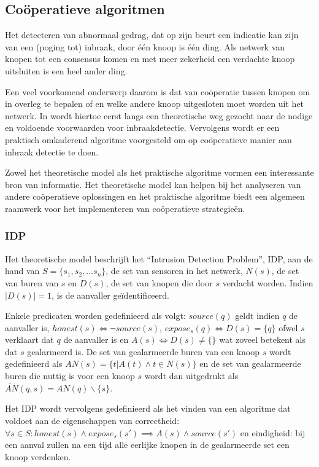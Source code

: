 \subsection{Co\"operatieve algoritmen}
\label{subsection:cooperation}

Het detecteren van abnormaal gedrag, dat op zijn beurt een indicatie kan zijn
van een (poging tot) inbraak, door \'e\'en knoop is \'e\'en ding. Als netwerk
van knopen tot een consensus komen en met meer zekerheid een verdachte knoop
uitsluiten is een heel ander ding.

Een veel voorkomend onderwerp daarom is dat van co\"operatie tussen knopen om
in overleg te bepalen of en welke andere knoop uitgesloten moet worden uit het
netwerk. In \cite{krontiris2009cooperative} wordt hiertoe eerst langs een
theoretische weg gezocht naar de nodige en voldoende voorwaarden voor
inbraakdetectie. Vervolgens wordt er een praktisch omkaderend algoritme
voorgesteld om op co\"operatieve manier aan inbraak detectie te doen.

Zowel het theoretische model als het praktische algoritme vormen een
interessante bron van informatie. Het theoretische model kan helpen bij het
analyseren van andere co\"operatieve oplossingen en het praktische algoritme
biedt een algemeen raamwerk voor het implementeren van co\"operatieve
strategie\"en.

\subsubsection*{IDP}

Het theoretische model beschrijft het ``Intrusion Detection Problem'', IDP, aan
de hand van $S = \{ s_1, s_2, \dots s_n \}$, de set van sensoren in het netwerk,
$N(s)$, de set van buren van $s$ en $D(s)$, de set van knopen die door $s$
verdacht worden. Indien $|D(s)| = 1$, is de aanvaller ge\"identificeerd.

Enkele predicaten worden gedefinieerd als volgt: $source(q)$ geldt indien $q$
de aanvaller is, $honest(s) \iff \neg source(s)$, $expose_s(q) \iff D(s) = \{ q
\}$ ofwel $s$ verklaart dat $q$ de aanvaller is en $A(s) \iff D(s) \not= \{\}$
wat zoveel betekent als dat $s$ gealarmeerd is. De set van gealarmeerde buren
van een knoop $s$ wordt gedefinieerd als $AN(s) = \{ t | A(t) \wedge t \in N(s)
\}$ en de set van gealarmeerde buren die nuttig is voor een knoop $s$ wordt dan
uitgedrukt als $\tilde{AN}(q,s) = AN(q) \backslash \{s\}$.

Het IDP wordt vervolgens gedefinieerd als het vinden van een algoritme dat
voldoet aan de eigenschappen van correctheid: $\forall s \in S : honest(s)
\wedge expose_s(s') \implies A(s) \wedge source(s')$ en eindigheid: bij een
aanval zullen na een tijd alle eerlijke knopen in de gealarmeerde set een knoop
verdenken.

